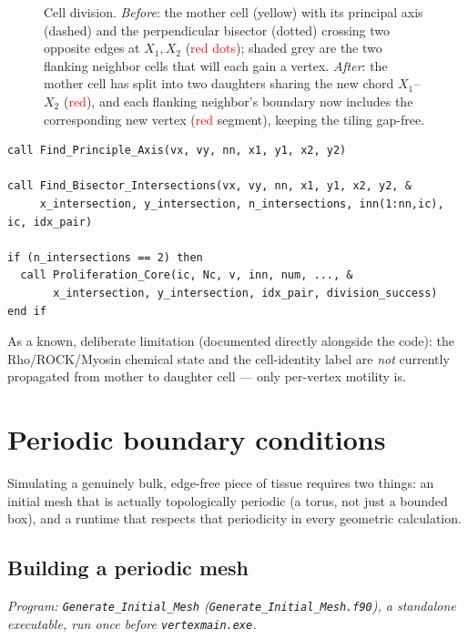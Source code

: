 \documentclass[11pt]{article}
\begin{document}
\begin{figure}[htbp]
\caption{Cell division. \emph{Before}: the mother cell (yellow) with its principal
axis (dashed) and the perpendicular bisector (dotted) crossing two opposite edges at
$X_1,X_2$ (\textcolor{red}{red dots}); shaded grey are the two flanking neighbor cells
that will each gain a vertex. \emph{After}: the mother cell has split into two
daughters sharing the new chord $X_1$--$X_2$ (\textcolor{red}{red}), and each flanking
neighbor's boundary now includes the corresponding new vertex (\textcolor{red}{red}
segment), keeping the tiling gap-free.}
\label{fig:division}
\end{figure}

\begin{lstlisting}[caption={The division geometry, at a glance (from
\texttt{Proliferation.f90}/\texttt{Geometry.f90}): principal axis, its perpendicular
bisector's two crossing points, then the actual split.}]
call Find_Principle_Axis(vx, vy, nn, x1, y1, x2, y2)

call Find_Bisector_Intersections(vx, vy, nn, x1, y1, x2, y2, &
     x_intersection, y_intersection, n_intersections, inn(1:nn,ic), ic, idx_pair)

if (n_intersections == 2) then
  call Proliferation_Core(ic, Nc, v, inn, num, ..., &
       x_intersection, y_intersection, idx_pair, division_success)
end if
\end{lstlisting}
As a known, deliberate limitation (documented directly alongside the code): the
Rho/ROCK/Myosin chemical state and the cell-identity label are \emph{not} currently
propagated from mother to daughter cell --- only per-vertex motility is.

\section{Periodic boundary conditions}
\label{sec:pbc}

Simulating a genuinely bulk, edge-free piece of tissue requires two things: an initial
mesh that is actually topologically periodic (a torus, not just a bounded box), and a
runtime that respects that periodicity in every geometric calculation.

\subsection{Building a periodic mesh}
\textit{Program: \texttt{Generate\_Initial\_Mesh} (\texttt{Generate\_Initial\_Mesh.f90}),
a standalone executable, run once before \texttt{vertexmain.exe}.}
\end{document}
